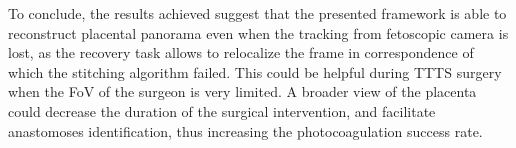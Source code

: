 \documentclass[sn-basic]{sn-jnl}%
\begin{document}
To conclude, the results achieved suggest that the presented framework is able to reconstruct placental panorama even when the tracking from fetoscopic camera is lost, as the recovery task allows to relocalize the frame in correspondence of which the stitching algorithm failed. This could be helpful during TTTS surgery when the FoV of the surgeon is very limited. A broader view of the placenta could decrease the duration of the surgical intervention, and facilitate anastomoses identification, thus increasing the photocoagulation success rate. 



\end{document}
